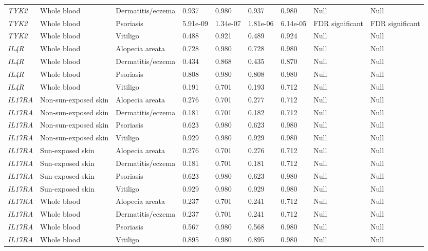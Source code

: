 \documentclass[10pt,a4paper]{article}
\begin{document}
\begin{landscape}
\begin{longtable}{p{1.7cm}p{3.2cm}p{2.8cm}p{2.2cm}p{2.2cm}p{2.2cm}p{2.2cm}p{3.0cm}p{3.0cm}}
\textit{TYK2} & Whole blood & Dermatitis/eczema & 0.937 & 0.980 & 0.937 & 0.980 & Null & Null \\
\textit{TYK2} & Whole blood & Psoriasis & 5.91e-09 & 1.34e-07 & 1.81e-06 & 6.14e-05 & FDR significant & FDR significant \\
\textit{TYK2} & Whole blood & Vitiligo & 0.488 & 0.921 & 0.489 & 0.924 & Null & Null \\
\textit{IL4R} & Whole blood & Alopecia areata & 0.728 & 0.980 & 0.728 & 0.980 & Null & Null \\
\textit{IL4R} & Whole blood & Dermatitis/eczema & 0.434 & 0.868 & 0.435 & 0.870 & Null & Null \\
\textit{IL4R} & Whole blood & Psoriasis & 0.808 & 0.980 & 0.808 & 0.980 & Null & Null \\
\textit{IL4R} & Whole blood & Vitiligo & 0.191 & 0.701 & 0.193 & 0.712 & Null & Null \\
\textit{IL17RA} & Non-sun-exposed skin & Alopecia areata & 0.276 & 0.701 & 0.277 & 0.712 & Null & Null \\
\textit{IL17RA} & Non-sun-exposed skin & Dermatitis/eczema & 0.181 & 0.701 & 0.182 & 0.712 & Null & Null \\
\textit{IL17RA} & Non-sun-exposed skin & Psoriasis & 0.623 & 0.980 & 0.623 & 0.980 & Null & Null \\
\textit{IL17RA} & Non-sun-exposed skin & Vitiligo & 0.929 & 0.980 & 0.929 & 0.980 & Null & Null \\
\textit{IL17RA} & Sun-exposed skin & Alopecia areata & 0.276 & 0.701 & 0.276 & 0.712 & Null & Null \\
\textit{IL17RA} & Sun-exposed skin & Dermatitis/eczema & 0.181 & 0.701 & 0.181 & 0.712 & Null & Null \\
\textit{IL17RA} & Sun-exposed skin & Psoriasis & 0.623 & 0.980 & 0.623 & 0.980 & Null & Null \\
\textit{IL17RA} & Sun-exposed skin & Vitiligo & 0.929 & 0.980 & 0.929 & 0.980 & Null & Null \\
\textit{IL17RA} & Whole blood & Alopecia areata & 0.237 & 0.701 & 0.241 & 0.712 & Null & Null \\
\textit{IL17RA} & Whole blood & Dermatitis/eczema & 0.237 & 0.701 & 0.241 & 0.712 & Null & Null \\
\textit{IL17RA} & Whole blood & Psoriasis & 0.567 & 0.980 & 0.568 & 0.980 & Null & Null \\
\textit{IL17RA} & Whole blood & Vitiligo & 0.895 & 0.980 & 0.895 & 0.980 & Null & Null \\

\end{longtable}
\end{landscape}
\end{document}
